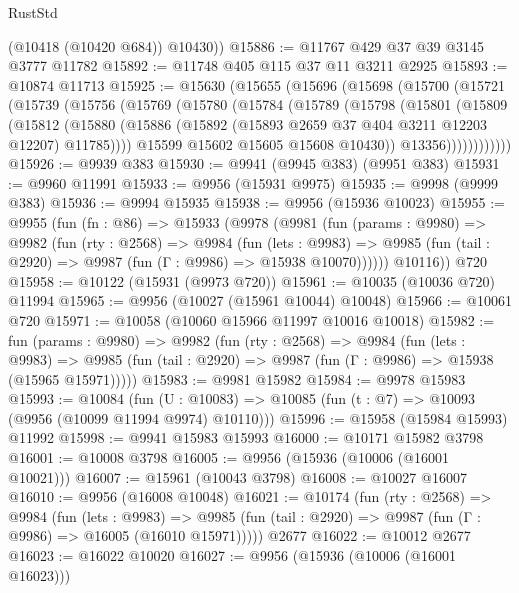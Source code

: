 \begin{lexlean}{RustStd}
\begin{coremodule}
        (@10418 (@10420 @684))
        @10430))
@15886 := @11767 @429 @37 @39 @3145 @3777 @11782
@15892 := @11748 @405 @115 @37 @11 @3211 @2925
@15893 := @10874 @11713
@15925 := @15630
    (@15655
      (@15696
        (@15698
          (@15700
            (@15721
              (@15739
                (@15756
                  (@15769
                    (@15780
                      (@15784
                        (@15789
                          (@15798
                            (@15801
                              (@15809
                                (@15812
                                  (@15880
                                    (@15886
                                      (@15892 (@15893 @2659 @37 @404 @3211 @12203 @12207) @11785))))
                                @15599
                                @15602
                                @15605
                                @15608
                                @10430))
                            @13356))))))))))))
@15926 := @9939 @383
@15930 := @9941 (@9945 @383) (@9951 @383)
@15931 := @9960 @11991
@15933 := @9956 (@15931 @9975)
@15935 := @9998 (@9999 @383)
@15936 := @9994 @15935
@15938 := @9956 (@15936 @10023)
@15955 := @9955
    (fun (fn : @86) =>
    @15933
      (@9978
        (@9981
          (fun (params : @9980) =>
          @9982
            (fun (rty : @2568) =>
            @9984
              (fun (lets : @9983) =>
              @9985 (fun (tail : @2920) => @9987 (fun (Γ : @9986) => @15938 @10070))))))
        @10116))
    @720
@15958 := @10122 (@15931 (@9973 @720))
@15961 := @10035 (@10036 @720) @11994
@15965 := @9956 (@10027 (@15961 @10044) @10048)
@15966 := @10061 @720
@15971 := @10058 (@10060 @15966 @11997 @10016 @10018)
@15982 := fun (params : @9980) =>
  @9982
    (fun (rty : @2568) =>
    @9984
      (fun (lets : @9983) =>
      @9985 (fun (tail : @2920) => @9987 (fun (Γ : @9986) => @15938 (@15965 @15971)))))
@15983 := @9981 @15982
@15984 := @9978 @15983
@15993 := @10084
    (fun (U : @10083) => @10085 (fun (t : @7) => @10093 (@9956 (@10099 @11994 @9974) @10110)))
@15996 := @15958 (@15984 @15993) @11992
@15998 := @9941 @15983 @15993
@16000 := @10171 @15982 @3798
@16001 := @10008 @3798
@16005 := @9956 (@15936 (@10006 (@16001 @10021)))
@16007 := @15961 (@10043 @3798)
@16008 := @10027 @16007
@16010 := @9956 (@16008 @10048)
@16021 := @10174
    (fun (rty : @2568) =>
    @9984
      (fun (lets : @9983) =>
      @9985 (fun (tail : @2920) => @9987 (fun (Γ : @9986) => @16005 (@16010 @15971)))))
    @2677
@16022 := @10012 @2677
@16023 := @16022 @10020
@16027 := @9956 (@15936 (@10006 (@16001 @16023)))

\end{coremodule}
\end{lexlean}
